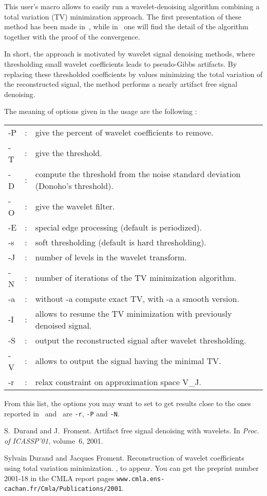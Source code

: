 This user's macro allows to easily run a wavelet-denoising algorithm combining a total 
variation (TV) minimization approach. The first presentation of these method has been
made in~\cite{DF:ArtifactFree}, while in~\cite{DF:ReconsWaveletUsingTV} one
will find the detail of the algorithm together with the proof of the convergence.

In short, the approach is motivated by wavelet signal denoising methods, where 
thresholding small wavelet coefficients leads to pseudo-Gibbs artifacts. By replacing
these thresholded coefficients by values minimizing the total variation of the
reconstructed signal, the method performs a nearly artifact free signal denoising.

The meaning of options given in the usage are the following :

\begin{tabular}{lcl}
-P &:& give the percent of wavelet coefficients to remove.\\
-T &:& give the threshold.\\
-D &:& compute the threshold from the noise standard deviation (Donoho's threshold).\\
-O &:& give the wavelet filter.\\
-E &:& special edge processing (default is periodized).\\
-s &:& soft thresholding (default is hard thresholding).\\
-J &:& number of levels in the wavelet transform.\\
-N &:& number of iterations of the TV minimization algorithm.\\
-a &:& without -a compute exact TV, with -a a smooth version.\\
-I &:& allows to resume the TV minimization with previously denoised signal.\\
-S &:& output the reconstructed signal after wavelet thresholding.\\
-V &:& allows to output the signal having the minimal TV.\\
-r &:& relax constraint on approximation space V\_J.
\end{tabular}

From this list, the options you may want to set to get results close to the ones
reported in~\cite{DF:ArtifactFree} and~\cite{DF:ReconsWaveletUsingTV} are
{\tt -r}, {\tt -P} and {\tt -N}.

\begin{thebibliography}{Dau1}

S.~Durand and J.~Froment.
\newblock Artifact free signal denoising with wavelets.
\newblock In {\em Proc. of ICASSP'01}, volume~6, 2001.

Sylvain Durand and Jacques Froment.
\newblock Reconstruction of wavelet coefficients using total variation minimization.
, to appear. You can get the preprint number 2001-18
in the CMLA report pages {\tt www.cmla.ens-cachan.fr/Cmla/Publications/2001}.


\end{thebibliography}
